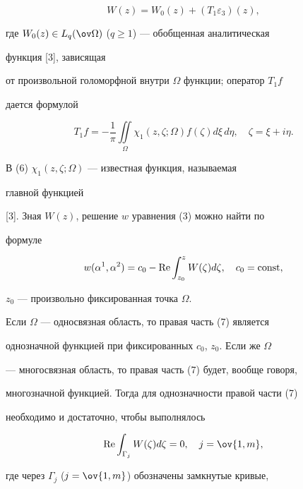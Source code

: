 \begin{equation} 


W(z)=W_0(z)+(T_1\varepsilon_3)(z), 


\end{equation} 


где $W_0(z)\in L_q(\ov\Omega)$ ($q\ge 1$) --- обобщенная аналитическая 


функция [3], зависящая  


от произвольной голоморфной внутри $\Omega$ функции; оператор $T_1f$ 


дается формулой 


\begin{equation} 


T_1f=-\frac{1}{\pi}\iint\limits_\Omega \chi_1(z,\zeta;\Omega) 


f(\zeta)d\xi\,d\eta,\quad \zeta=\xi+i\eta. 


\end{equation} 


В (6)\; $\chi_1(z,\zeta;\Omega)$ --- известная функция, называемая 


главной функцией 


[3]. Зная $W(z)$, решение $w$ уравнения (3) можно найти по 


формуле 


\begin{equation} 


w(\alpha^1,\alpha^2)=c_0-\re\int^z_{z_0}W(\zeta)d\zeta,\quad 


c_0=\const, 


\end{equation} 


$z_0$ --- произвольно фиксированная точка $\Omega$. 


 


Если $\Omega$ --- односвязная область, то правая часть (7) является  


однозначной функцией при фиксированных $c_0$, $z_0$. Если же $\Omega$ 


--- многосвязная область, то правая часть (7) будет, вообще говоря,  


многозначной функцией. Тогда для однозначности правой части (7)  


необходимо и достаточно, чтобы выполнялось 


$$ 


\re\int_{\Gamma_j}W(\zeta)d\zeta=0,\quad j=\ov{1,m}, 


$$ 


где через $\Gamma_j$ ($j=\ov{1,m}$) обозначены замкнутые кривые, 


